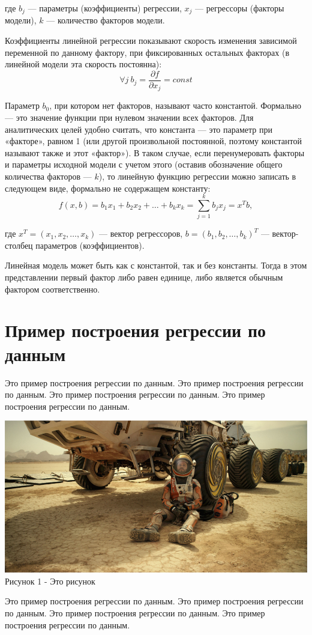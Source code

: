 \documentclass[oneside,a4paper,final,14pt]{article}
\begin{document}
где $b_j$ — параметры (коэффициенты) регрессии, $x_j$ — регрессоры (факторы модели), $k$ — количество факторов модели.

Коэффициенты линейной регрессии показывают скорость изменения зависимой переменной по данному фактору, при фиксированных остальных факторах (в линейной модели эта скорость постоянна):
\begin{equation}
\forall j ~b_j=\frac {\partial f}{\partial x_j}=const
\end{equation}

Параметр $b_0$, при котором нет факторов, называют часто константой. Формально — это значение функции при нулевом значении всех факторов. Для аналитических целей удобно считать, что константа — это параметр при «факторе», равном 1 (или другой произвольной постоянной, поэтому константой называют также и этот «фактор»). В таком случае, если перенумеровать факторы и параметры исходной модели с учетом этого (оставив обозначение общего количества факторов — $k$), то линейную функцию регрессии можно записать в следующем виде, формально не содержащем константу:
$$f(x,b)=b_1 x_1 + b_2 x_2 + \ldots + b_k x_k=\sum^k_{j=1}b_j x_j=x^Tb,$$

где $x^T=(x_1,x_2,\ldots,x_k)$ — вектор регрессоров, $b=(b_1,b_2, \ldots,b_k)^T$ — вектор-столбец параметров (коэффициентов).

Линейная модель может быть как с константой, так и без константы. Тогда в этом представлении первый фактор либо равен единице, либо является обычным фактором соответственно.

\newpage

\section{Пример построения регрессии по данным}
\vspace{12pt}

Это пример построения регрессии по данным. Это пример построения регрессии по данным. Это пример построения регрессии по данным. Это пример построения регрессии по данным.

\begin{center}
  \includegraphics[scale=1.0]{images/rest.jpg}\\
  Рисунок 1 - Это рисунок
\end{center}
\vspace{-12pt}

Это пример построения регрессии по данным. Это пример построения регрессии по данным. Это пример построения регрессии по данным. Это пример построения регрессии по данным.

\end{document}

